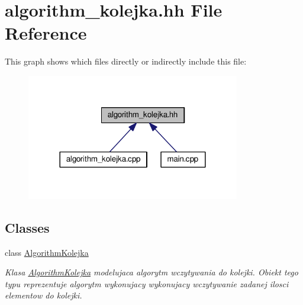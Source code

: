 \hypertarget{algorithm__kolejka_8hh}{\section{algorithm\-\_\-kolejka.\-hh File Reference}
\label{algorithm__kolejka_8hh}
}
This graph shows which files directly or indirectly include this file\-:\nopagebreak
\begin{figure}[H]
\begin{center}
\leavevmode
\includegraphics[width=264pt]{algorithm__kolejka_8hh__dep__incl}
\end{center}
\end{figure}
\subsection*{Classes}
\begin{DoxyCompactItemize}
\item 
class \hyperlink{class_algorithm_kolejka}{Algorithm\-Kolejka}
\begin{DoxyCompactList}\small\item\em Klasa \hyperlink{class_algorithm_kolejka}{Algorithm\-Kolejka} modelujaca algorytm wczytywania do kolejki. Obiekt tego typu reprezentuje algorytm wykonujacy wykonujacy wczytywanie zadanej ilosci elementow do kolejki. \end{DoxyCompactList}\end{DoxyCompactItemize}
